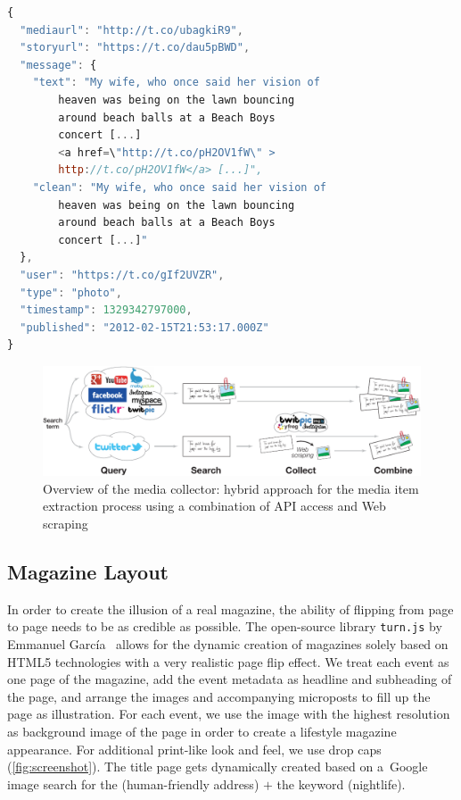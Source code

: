 \documentclass{acm_proc_article-sp}
\begin{document}
{\begin{lstlisting}[language=JavaScript,caption={Sample output of the media collector showing a~\mbox{Google+} post (edited for legibility, URLs shortened).},label={lst:media}]
{
  "mediaurl": "http://t.co/ubagkiR9",
  "storyurl": "https://t.co/dau5pBWD",
  "message": {
    "text": "My wife, who once said her vision of
        heaven was being on the lawn bouncing
        around beach balls at a Beach Boys
        concert [...]
        <a href=\"http://t.co/pH2OV1fW\" >
        http://t.co/pH2OV1fW</a> [...]",
    "clean": "My wife, who once said her vision of
        heaven was being on the lawn bouncing
        around beach balls at a Beach Boys
        concert [...]"
  },
  "user": "https://t.co/gIf2UVZR",
  "type": "photo",
  "timestamp": 1329342797000,
  "published": "2012-02-15T21:53:17.000Z"
}
\end{lstlisting}

\begin{figure}[htb!]
\centering
\includegraphics[width=0.8\linewidth]{./architecture.pdf}
\caption{Overview of the media collector: hybrid approach for the media item extraction process using a combination of API access and Web scraping}
\label{fig:architecture}
\end{figure}

\subsection{Magazine Layout}
In order to create the illusion of a real magazine, the ability of flipping from page to page needs to be as credible as possible. The open-source library \texttt{turn.js} by Emmanuel García~\cite{TurnJs2012} allows for the dynamic creation of magazines solely based on HTML5 technologies with a very realistic page flip effect. We treat each event as one page of the magazine, add the event metadata as headline and subheading of the page, and arrange the images and accompanying microposts to fill up the page as illustration. For each event, we use the image with the highest resolution as background image of the page in order to create a lifestyle magazine appearance. For additional print-like look and feel, we use drop caps (\autoref{fig:screenshot}). The title page gets dynamically created based on a~Google image search for the (human-friendly address) $+$ the keyword (nightlife).

}
\end{document}
